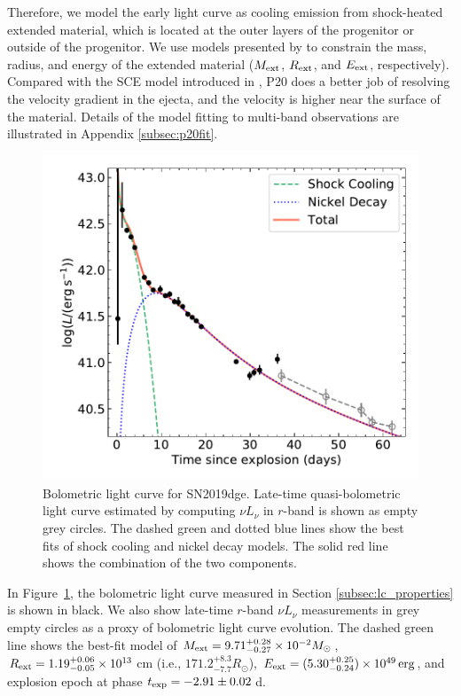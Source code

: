 \documentclass[twocolumn]{aastex63}
\newcommand{\name}{SN2019dge}
\begin{document}
Therefore, we model the early light curve as cooling emission from shock-heated extended material, 
which is located at the outer layers of the progenitor or outside of the progenitor. {\color{red} We use 
models presented by \citet[][hereafter P20]{Piro2020} to constrain the mass, radius, and energy of the 
extended material ($M_{\rm ext}$, $R_{\rm ext}$, and $E_{\rm ext}$, respectively). Compared with the 
SCE model introduced in \citet{Piro2015}, P20 does a better job of resolving the velocity gradient in the 
ejecta, and the velocity is higher near the surface of the material.}
Details of the model fitting to multi-band observations are illustrated in Appendix \ref{subsec:p20fit}. 
\begin{figure}
	\centering
	\includegraphics[width=\columnwidth]{figures/Lbb.pdf}
	\caption{Bolometric light curve for \name. Late-time quasi-bolometric light curve 
	estimated by computing $\nu L_\nu$ in $r$-band is shown as empty grey circles. The dashed green 
	and dotted blue lines show the best fits of shock cooling and nickel decay models. The solid red line 
	shows the combination of the two components.}
	\label{fig:Lbb}
\end{figure}

In Figure~\ref{fig:Lbb}, the bolometric light curve measured in Section \ref{subsec:lc_properties} is 
shown in black. We also show late-time $r$-band $\nu L_{\nu}$ measurements in grey empty circles as 
a proxy of bolometric light curve evolution. The dashed green line shows the best-fit model of 
{\color{red}
$M_{\rm ext} = 9.71^{+0.28}_{-0.27} \times 10^{-2} M_\odot$,
 $R_{\rm ext} =1.19_{-0.05}^{+0.06}\times10^{13}$\,cm (i.e., $171.2_{-7.7}^{+8.3} R_\odot$), $E_{\rm ext} 
 = (5.30^{+0.25}_{-0.24}) \times 10^{49}\,{\rm erg}$, and explosion epoch at phase $t_{\rm exp}= -2.91 
 \pm 0.02$\,d. }
\end{document}
